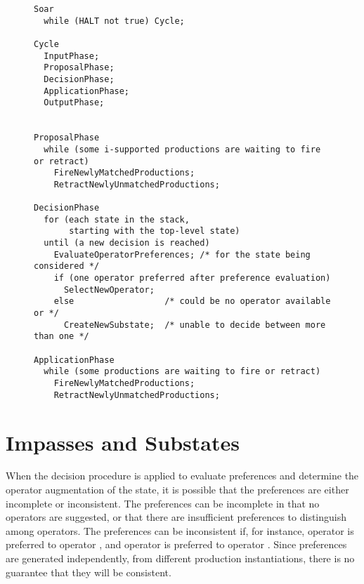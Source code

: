 \begin{figure}
\label{fig:decisioncycle}
\end{figure}

\begin{figure}
\begin{verbatim}
Soar
  while (HALT not true) Cycle;
  
Cycle
  InputPhase;
  ProposalPhase;
  DecisionPhase;
  ApplicationPhase;
  OutputPhase;


ProposalPhase
  while (some i-supported productions are waiting to fire or retract)
    FireNewlyMatchedProductions;
    RetractNewlyUnmatchedProductions;

DecisionPhase
  for (each state in the stack, 
       starting with the top-level state)
  until (a new decision is reached)
    EvaluateOperatorPreferences; /* for the state being considered */
    if (one operator preferred after preference evaluation)
      SelectNewOperator;
    else                  /* could be no operator available or */
      CreateNewSubstate;  /* unable to decide between more than one */

ApplicationPhase
  while (some productions are waiting to fire or retract)
    FireNewlyMatchedProductions;
    RetractNewlyUnmatchedProductions;
\end{verbatim}

\label{fig:pseudocode}
\end{figure}

\section{Impasses and Substates}
\label{ARCH-impasses}

When the decision procedure is applied to evaluate preferences and determine
the operator augmentation of the state, it is possible that the preferences are 
either
incomplete or inconsistent.
The preferences can be incomplete in that no  operators are 
suggested, or that there are insufficient preferences to distinguish among
 operators. The preferences can be inconsistent if, for instance, 
operator
 is preferred to operator , and operator  is preferred 
to operator . Since preferences are generated independently,
from different production instantiations, there is no guarantee that
they will be consistent.

